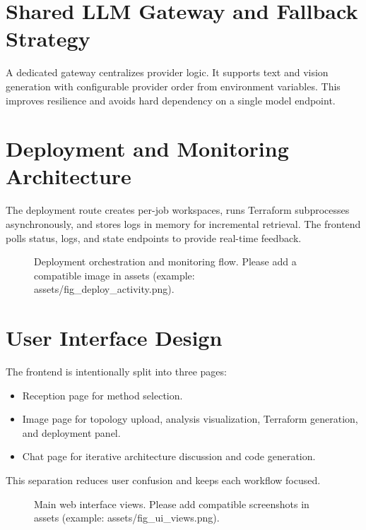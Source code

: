 \documentclass[12pt,a4paper,openany]{report}
\begin{document}
\section{Shared LLM Gateway and Fallback Strategy}

A dedicated gateway centralizes provider logic. It supports text and vision generation with configurable provider order from environment variables. This improves resilience and avoids hard dependency on a single model endpoint.

\section{Deployment and Monitoring Architecture}

The deployment route creates per-job workspaces, runs Terraform subprocesses asynchronously, and stores logs in memory for incremental retrieval. The frontend polls status, logs, and state endpoints to provide real-time feedback.

\begin{figure}[H]
    \centering
    \caption{Deployment orchestration and monitoring flow. Please add a compatible image in assets (example: assets/fig_deploy_activity.png).}
    \label{fig:deploy_activity}
\end{figure}

\section{User Interface Design}

The frontend is intentionally split into three pages:
\begin{itemize}
    \item Reception page for method selection.
    \item Image page for topology upload, analysis visualization, Terraform generation, and deployment panel.
    \item Chat page for iterative architecture discussion and code generation.
\end{itemize}

This separation reduces user confusion and keeps each workflow focused.

\begin{figure}[H]
    \centering
    \caption{Main web interface views. Please add compatible screenshots in assets (example: assets/fig_ui_views.png).}
    \label{fig:ui_views}
\end{figure}
\end{document}
